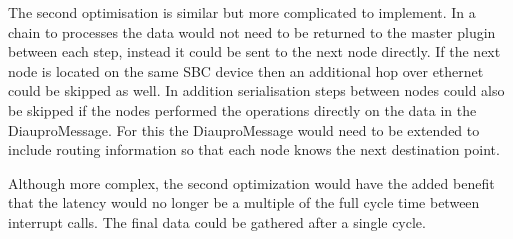 The second optimisation is similar but more complicated to implement. In a chain to processes the data would not need to be returned to the master plugin between each step, instead it could be sent to the next node directly. If the next node is located on the same SBC device then an additional hop over ethernet could be skipped as well. In addition serialisation steps between nodes could also be skipped if the nodes performed the operations directly on the data in the DiauproMessage. For this the DiauproMessage would need to be extended to include routing information so that each node knows the next destination point.

Although more complex, the second optimization would have the added benefit that the latency would no longer be a multiple of the full cycle time between interrupt calls. The final data could be gathered after a single cycle.


